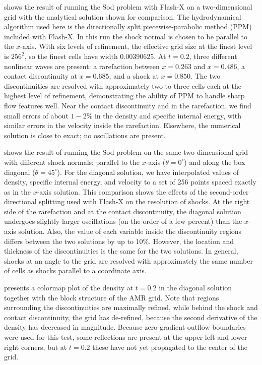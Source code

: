  shows the result of running the Sod problem
with Flash-X on a two-dimensional grid with the analytical solution
shown for comparison. The hydrodynamical algorithm used here is the
directionally split piecewise-parabolic method (PPM) included with
Flash-X. In this run the shock normal is chosen to be parallel to the
$x$-axis. With six levels of refinement, the effective grid size at
the finest level is $256^2$, so the finest cells have width
0.00390625. At $t=0.2$, three different nonlinear waves are present:
a rarefaction between $x = 0.263$ and $x = 0.486$, a contact
discontinuity at $x = 0.685$, and a shock at $x = 0.850$. The two
discontinuities are resolved with approximately two to three cells
each at the highest level of refinement, demonstrating the ability
of PPM to handle sharp flow features well. Near the contact
discontinuity and in the rarefaction, we find small errors of about
$1-2\%$ in the density and specific internal energy, with similar
errors in the velocity inside the rarefaction. Elsewhere, the
numerical solution is close to exact; no oscillations are present.

 shows the result of running the Sod
problem on the same two-dimensional grid with different shock
normals: parallel to the $x$-axis ($\theta=0^\circ$) and along the
box diagonal ($\theta=45^\circ$). For the diagonal solution, we have
interpolated values of density, specific internal energy, and
velocity to a set of 256 points spaced exactly as in the $x$-axis
solution. This comparison shows the effects of the second-order
directional splitting used with Flash-X on the resolution of shocks.
At the right side of the rarefaction and at the contact
discontinuity, the diagonal solution undergoes slightly larger
oscillations (on the order of a few percent) than the $x$-axis
solution. Also, the value of each variable inside the discontinuity
regions differs between the two solutions by up to 10\%. However,
the location and thickness of the discontinuities is the same for
the two solutions. In general, shocks at an angle to the grid are
resolved with approximately the same number of cells as shocks
parallel to a coordinate axis.

 presents a colormap plot of the density at
$t=0.2$ in the diagonal solution together with the block structure
of the AMR grid. Note that regions surrounding the discontinuities
are maximally refined, while behind the shock and contact
discontinuity, the grid has de-refined, because the second
derivative of the density has decreased in magnitude. Because
zero-gradient outflow boundaries were used for this test, some
reflections are present at the upper left and lower right corners,
but at $t=0.2$ these have not yet propagated to the center of the
grid.

